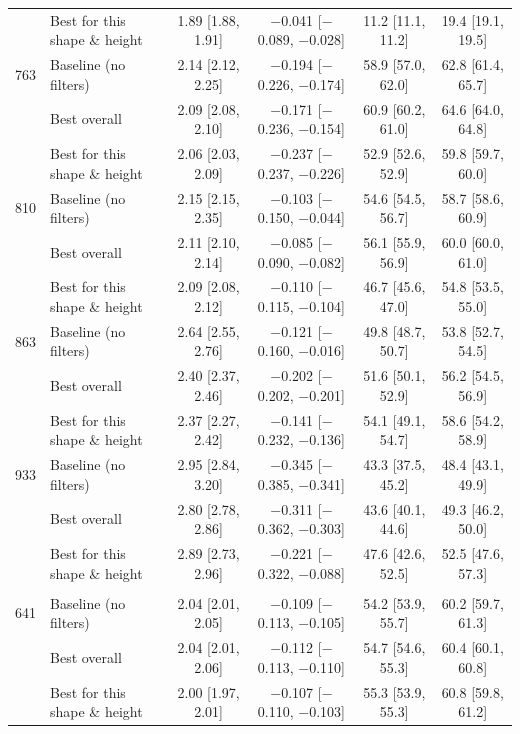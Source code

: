 \begin{table}[H]
\begin{tabular}{r l *{4}{c}}
		 & Best for this shape \& height & 1.89 [1.88, 1.91] & $-$0.041 [$-$0.089, $-$0.028] & 11.2 [11.1, 11.2] & 19.4 [19.1, 19.5] \\
		763 & Baseline (no filters) & 2.14 [2.12, 2.25] & $-$0.194 [$-$0.226, $-$0.174] & 58.9 [57.0, 62.0] & 62.8 [61.4, 65.7] \\
		 & Best overall & 2.09 [2.08, 2.10] & $-$0.171 [$-$0.236, $-$0.154] & 60.9 [60.2, 61.0] & 64.6 [64.0, 64.8] \\
		 & Best for this shape \& height & 2.06 [2.03, 2.09] & $-$0.237 [$-$0.237, $-$0.226] & 52.9 [52.6, 52.9] & 59.8 [59.7, 60.0] \\
		810 & Baseline (no filters) & 2.15 [2.15, 2.35] & $-$0.103 [$-$0.150, $-$0.044] & 54.6 [54.5, 56.7] & 58.7 [58.6, 60.9] \\
		 & Best overall & 2.11 [2.10, 2.14] & $-$0.085 [$-$0.090, $-$0.082] & 56.1 [55.9, 56.9] & 60.0 [60.0, 61.0] \\
		 & Best for this shape \& height & 2.09 [2.08, 2.12] & $-$0.110 [$-$0.115, $-$0.104] & 46.7 [45.6, 47.0] & 54.8 [53.5, 55.0] \\
		863 & Baseline (no filters) & 2.64 [2.55, 2.76] & $-$0.121 [$-$0.160, $-$0.016] & 49.8 [48.7, 50.7] & 53.8 [52.7, 54.5] \\
		 & Best overall & 2.40 [2.37, 2.46] & $-$0.202 [$-$0.202, $-$0.201] & 51.6 [50.1, 52.9] & 56.2 [54.5, 56.9] \\
		 & Best for this shape \& height & 2.37 [2.27, 2.42] & $-$0.141 [$-$0.232, $-$0.136] & 54.1 [49.1, 54.7] & 58.6 [54.2, 58.9] \\
		933 & Baseline (no filters) & 2.95 [2.84, 3.20] & $-$0.345 [$-$0.385, $-$0.341] & 43.3 [37.5, 45.2] & 48.4 [43.1, 49.9] \\
		 & Best overall & 2.80 [2.78, 2.86] & $-$0.311 [$-$0.362, $-$0.303] & 43.6 [40.1, 44.6] & 49.3 [46.2, 50.0] \\
		 & Best for this shape \& height & 2.89 [2.73, 2.96] & $-$0.221 [$-$0.322, $-$0.088] & 47.6 [42.6, 52.5] & 52.5 [47.6, 57.3] \\
		\addlinespace
		\multicolumn{6}{l}{\textit{Small Egg Box}} \\
		641 & Baseline (no filters) & 2.04 [2.01, 2.05] & $-$0.109 [$-$0.113, $-$0.105] & 54.2 [53.9, 55.7] & 60.2 [59.7, 61.3] \\
		 & Best overall & 2.04 [2.01, 2.06] & $-$0.112 [$-$0.113, $-$0.110] & 54.7 [54.6, 55.3] & 60.4 [60.1, 60.8] \\
		 & Best for this shape \& height & 2.00 [1.97, 2.01] & $-$0.107 [$-$0.110, $-$0.103] & 55.3 [53.9, 55.3] & 60.8 [59.8, 61.2] \\

\end{tabular}
\end{table}
